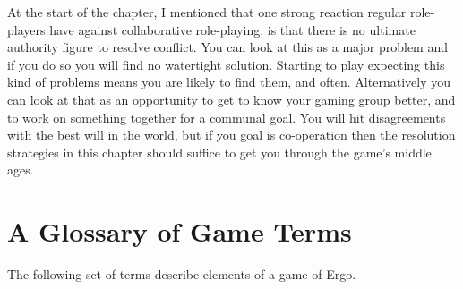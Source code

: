 \documentclass[twoside]{book}
\begin{document}
At the start of the chapter, I mentioned that one strong reaction
regular role-players have against collaborative role-playing, is that
there is no ultimate authority figure to resolve conflict. You can
look at this as a major problem and if you do so you will find no
watertight solution. Starting to play expecting this kind of problems
means you are likely to find them, and often. Alternatively you can
look at that as an opportunity to get to know your gaming group
better, and to work on something together for a communal goal. You
will hit disagreements with the best will in the world, but if you
goal is co-operation then the resolution strategies in this chapter
should suffice to get you through the game's middle ages.

\appendix
\chapter{A Glossary of Game Terms}

The following set of terms describe elements of a game of Ergo.
\end{document}
